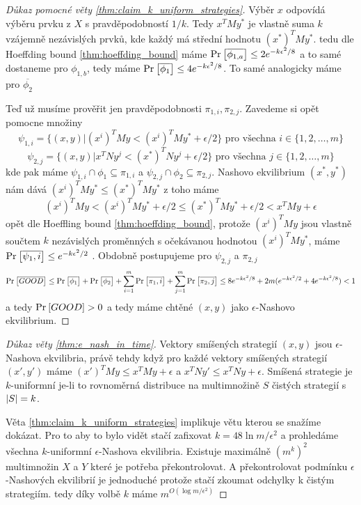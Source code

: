 \begin{proof}[Důkaz pomocné věty \ref{thm:claim_k_uniform_strategies}]
Výběr $x$ odpovídá výběru prvku z $X$ s pravděpodobností $1/k$. 
Tedy $x^T M y^*$ je vlastně suma $k$ vzájemně nezávislých prvků, kde každý má střední hodnotu $(x^*)^T M y^*$. tedu dle Hoeffding bound \ref{thm:hoeffding_bound} máme $\text{Pr}_{}\left[\overline{\phi_{1,a}}\right] \leq  2e^{-k\epsilon^2 /8}$ a to samé dostaneme pro $\phi_{1,b}$, tedy máme $\text{Pr}_{}\left[\overline{\phi_1}\right] \leq 4e^{-k \epsilon^2 /8}$. 
To samé analogicky máme pro $\overline{\phi_2}$

Teď už musíme prověřit jen pravděpodobnosti $\pi_{1,i}, \pi_{2,j}$. Zavedeme si opět pomocne množiny 
$$ 
\psi_{1,i} = \{ (x,y) | (x^i)^T M y < (x^i)^T M y^* + \epsilon/2 \} \text{ pro všechna } i \in \{1,2, \dots, m\}
$$ 
$$ 
\psi_{2,j} = \{ (x,y) | x^T N y^j < (x^*)^T N y^j + \epsilon/2 \} \text{ pro všechna } j \in \{1,2, \dots, m\}
$$
kde pak máme $\psi_{1,i} \cap \phi_1 \subseteq \pi_{1,i}$ a $\psi_{2,j} \cap \phi_2 \subseteq \pi_{2,j}$. 
Nashovo ekvilibrium $(x^*,y^*)$ nám dává $(x^i)^T M y^* \leq (x^*)^T M y^*$ z toho máme 
$$ 
(x^i)^T M y < (x^i)^T M y^* + \epsilon/2 \leq (x^*)^T M y^* + \epsilon /2 < x^T M y + \epsilon 
$$
opět dle Hoeffling bound \ref{thm:hoeffding_bound}, protože $(x^i)^T M y$ jsou vlastně součtem $k$ nezávislých proměnných s očekávanou hodnotou $(x^i)^T M y^*$, máme $\text{Pr}_{}\left[\overline{\psi_1,i}\right] \leq e^{-k \epsilon^2 /2}$ . 
Obdobně postupujeme pro $\psi_{2,j}$ a $\pi_{2,j}$
$$
\text{Pr}_{}\left[\overline{GOOD}\right] \leq \text{Pr}_{}\left[\overline{\phi_1}\right] + \text{Pr}_{}\left[\overline{\phi_2}\right] + \sum^m_{i=1} \text{Pr}_{}\left[\overline{\pi_1,i}\right]  + \sum^m_{j=1} \text{Pr}_{}\left[\overline{\pi_2,j}\right] \leq 8e^{-k \epsilon^2 /8} + 2m( e^{-k \epsilon^2 /2} +  4e^{-k \epsilon^2 /8})<1
$$
a tedy $\text{Pr}_{}\left[GOOD\right]>0$ a tedy máme chtěné $(x,y)$ jako $\epsilon$-Nashovo ekvilibrium.
\end{proof}

\begin{proof}[Důkaz věty \ref{thm:e_nash_in_time}]
   Vektory smíšených strategií $(x,y)$ jsou $\epsilon$-Nashova ekvilibria, právě tehdy když pro každé vektory smíšených strategií $(x',y')$ máme $(x')^T M y \leq x^T M y + \epsilon$ a $x^T N y' \leq x^T N y + \epsilon$. 
   Smíšená strategie je $k$-uniformní je-li to rovnoměrná distribuce na multimnožině $S$ čistých strategií s $\left|S\right| = k$. 

   Věta \ref{thm:claim_k_uniform_strategies} implikuje větu kterou se snažíme dokázat. 
   Pro to aby to bylo vidět stačí zafixovat $k = 48 \ln m/\epsilon^2$ a prohledáme všechna $k$-uniformní $\epsilon$-Nashova ekvilibria. 
   Existuje maximálně $(m^k)^2$ multimnožin $X$ a $Y$ které je potřeba překontrolovat. 
   A překontrolovat podmínku $\epsilon$-Nashových ekvilibrií je jednoduché protože stačí zkoumat odchylky k čistým strategiím. 
   tedy díky volbě $k$ máme $m^{O(\log m/\epsilon^2)}$
\end{proof}
